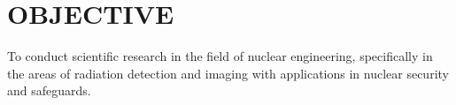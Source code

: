 \section{\small{OBJECTIVE}} 

To conduct scientific research in the field of nuclear engineering, specifically in the areas of radiation detection and imaging with applications in nuclear security and safeguards.